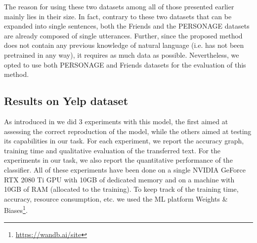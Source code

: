\documentclass[nomenclature, english, biblatex]{kththesis}
\begin{document}
The reason for using these two datasets among all of those presented earlier mainly lies in their size. In fact, contrary to these two datasets that can be expanded into single sentences, both the Friends and the PERSONAGE datasets are already composed of single utterances. Further, since the proposed method does not contain any previous knowledge of natural language (i.e. has not been pretrained in any way), it requires as much data as possible. Nevertheless, we opted to use both PERSONAGE and Friends datasets for the evaluation of this method.
\subsection{Results on Yelp dataset}
As introduced in  we did 3 experiments with this model, the first aimed at assessing the correct reproduction of the model, while the others aimed at testing its capabilities in our task. For each experiment, we report the accuracy graph, training time and qualitative evaluation of the transferred text. For the experiments in our task, we also report the quantitative performance of the classifier. All of these experiments have been done on a single NVIDIA GeForce RTX 2080 Ti GPU with 10GB of dedicated memory and on a machine with 10GB of RAM (allocated to the training). To keep track of the training time, accuracy, resource consumption, etc. we used the \gls{ML} platform Weights \& Biases\footnote{\url{https://wandb.ai/site}}.
\end{document}
